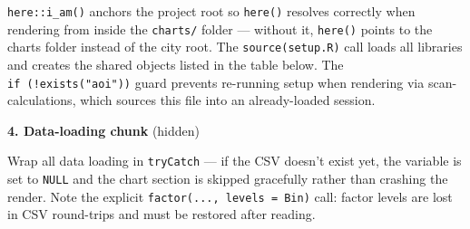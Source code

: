 \documentclass[
  letterpaper,
  DIV=11,
  numbers=noendperiod]{scrreprt}
\newenvironment{Shaded}{\begin{snugshade}}{\end{snugshade}}
\newcommand{\AttributeTok}[1]{\textcolor[rgb]{0.40,0.45,0.13}{#1}}
\newcommand{\CommentTok}[1]{\textcolor[rgb]{0.37,0.37,0.37}{#1}}
\newcommand{\ConstantTok}[1]{\textcolor[rgb]{0.56,0.35,0.01}{#1}}
\newcommand{\ControlFlowTok}[1]{\textcolor[rgb]{0.00,0.23,0.31}{\textbf{#1}}}
\newcommand{\DecValTok}[1]{\textcolor[rgb]{0.68,0.00,0.00}{#1}}
\newcommand{\FunctionTok}[1]{\textcolor[rgb]{0.28,0.35,0.67}{#1}}
\newcommand{\NormalTok}[1]{\textcolor[rgb]{0.00,0.23,0.31}{#1}}
\newcommand{\OtherTok}[1]{\textcolor[rgb]{0.00,0.23,0.31}{#1}}
\newcommand{\SpecialCharTok}[1]{\textcolor[rgb]{0.37,0.37,0.37}{#1}}
\newcommand{\StringTok}[1]{\textcolor[rgb]{0.13,0.47,0.30}{#1}}
\begin{document}
\texttt{here::i\_am()} anchors the project root so \texttt{here()}
resolves correctly when rendering from inside the \texttt{charts/}
folder --- without it, \texttt{here()} points to the charts folder
instead of the city root. The \texttt{source(setup.R)} call loads all
libraries and creates the shared objects listed in the table below. The
\texttt{if\ (!exists("aoi"))} guard prevents re-running setup when
rendering via scan-calculations, which sources this file into an
already-loaded session.

\textbf{4. Data-loading chunk} (hidden)

\begin{Shaded}
\end{Shaded}

Wrap all data loading in \texttt{tryCatch} --- if the CSV doesn't exist
yet, the variable is set to \texttt{NULL} and the chart section is
skipped gracefully rather than crashing the render. Note the explicit
\texttt{factor(...,\ levels\ =\ Bin)} call: factor levels are lost in
CSV round-trips and must be restored after reading.
\end{document}
